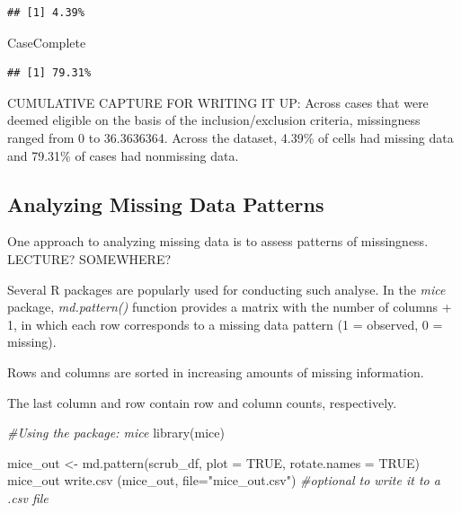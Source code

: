 \documentclass[
  english,
]{book}
\newenvironment{Shaded}{\begin{snugshade}}{\end{snugshade}}
\newcommand{\AttributeTok}[1]{\textcolor[rgb]{0.77,0.63,0.00}{#1}}
\newcommand{\CommentTok}[1]{\textcolor[rgb]{0.56,0.35,0.01}{\textit{#1}}}
\newcommand{\ConstantTok}[1]{\textcolor[rgb]{0.00,0.00,0.00}{#1}}
\newcommand{\FunctionTok}[1]{\textcolor[rgb]{0.00,0.00,0.00}{#1}}
\newcommand{\NormalTok}[1]{#1}
\newcommand{\OtherTok}[1]{\textcolor[rgb]{0.56,0.35,0.01}{#1}}
\newcommand{\StringTok}[1]{\textcolor[rgb]{0.31,0.60,0.02}{#1}}
\begin{document}
\begin{verbatim}
## [1] 4.39%
\end{verbatim}

\begin{Shaded}
\begin{Highlighting}[]
\NormalTok{CaseComplete}
\end{Highlighting}
\end{Shaded}

\begin{verbatim}
## [1] 79.31%
\end{verbatim}

CUMULATIVE CAPTURE FOR WRITING IT UP: Across cases that were deemed eligible on the basis of the inclusion/exclusion criteria, missingness ranged from 0 to 36.3636364. Across the dataset, 4.39\% of cells had missing data and 79.31\% of cases had nonmissing data.

\hypertarget{analyzing-missing-data-patterns}{%
\subsection{Analyzing Missing Data Patterns}\label{analyzing-missing-data-patterns}}

One approach to analyzing missing data is to assess patterns of missingness. LECTURE? SOMEWHERE?

Several R packages are popularly used for conducting such analyse. In the \emph{mice} package, \emph{md.pattern()} function provides a matrix with the number of columns + 1, in which each row corresponds to a missing data pattern (1 = observed, 0 = missing).

Rows and columns are sorted in increasing amounts of missing information.

The last column and row contain row and column counts, respectively.

\begin{Shaded}
\begin{Highlighting}[]
\CommentTok{\#Using the package: mice}
\FunctionTok{library}\NormalTok{(mice)}

\NormalTok{mice\_out }\OtherTok{\textless{}{-}} \FunctionTok{md.pattern}\NormalTok{(scrub\_df, }\AttributeTok{plot =} \ConstantTok{TRUE}\NormalTok{, }\AttributeTok{rotate.names =} \ConstantTok{TRUE}\NormalTok{)}
\NormalTok{mice\_out}
\FunctionTok{write.csv}\NormalTok{ (mice\_out, }\AttributeTok{file=}\StringTok{"mice\_out.csv"}\NormalTok{) }\CommentTok{\#optional to write it to a .csv file}
\end{Highlighting}
\end{Shaded}
\end{document}
